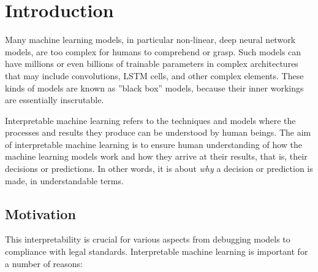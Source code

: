 
\section{Introduction}

Many machine learning models, in particular non-linear, deep neural network models, are too complex for humans to comprehend or grasp. Such models can have millions or even billions of trainable parameters in complex architectures that may include convolutions, LSTM cells, and other complex elements. These kinds of models are known as ''black box'' models, because their inner workings are essentially inscrutable.

Interpretable machine learning refers to the techniques and models where the processes and results they produce can be understood by human beings. The aim of interpretable machine learning is to ensure human understanding of how the machine learning models work and how they arrive at their results, that is, their decisions or predictions. In other words, it is about \emph{why} a decision or prediction is made, in understandable terms. 

\subsection*{Motivation}

This interpretability is crucial for various aspects from debugging models to compliance with legal standards. Interpretable machine learning is important for a number of reasons:

